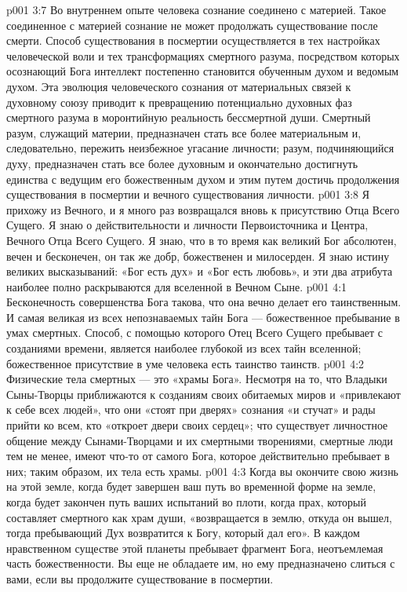 \vs p001 3:7 \pc Во внутреннем опыте человека сознание соединено с материей. Такое соединенное с материей сознание не может продолжать существование после смерти. Способ существования в посмертии осуществляется в тех настройках человеческой воли и тех трансформациях смертного разума, посредством которых осознающий Бога интеллект постепенно становится обученным духом и ведомым духом. Эта эволюция человеческого сознания от материальных связей к духовному союзу приводит к превращению потенциально духовных фаз смертного разума в моронтийную реальность бессмертной души. Смертный разум, служащий материи, предназначен стать все более материальным и, следовательно, пережить неизбежное угасание личности; разум, подчиняющийся духу, предназначен стать все более духовным и окончательно достигнуть единства с ведущим его божественным духом и этим путем достичь продолжения существования в посмертии и вечного существования личности.
\vs p001 3:8 Я прихожу из Вечного, и я много раз возвращался вновь к присутствию Отца Всего Сущего. Я знаю о действительности и личности Первоисточника и Центра, Вечного Отца Всего Сущего. Я знаю, что в то время как великий Бог абсолютен, вечен и бесконечен, он так же добр, божественен и милосерден. Я знаю истину великих высказываний: «Бог есть дух» и «Бог есть любовь», и эти два атрибута наиболее полно раскрываются для вселенной в Вечном Сыне.
\vs p001 4:1 Бесконечность совершенства Бога такова, что она вечно делает его таинственным. И самая великая из всех непознаваемых тайн Бога --- божественное пребывание в умах смертных. Способ, с помощью которого Отец Всего Сущего пребывает с созданиями времени, является наиболее глубокой из всех тайн вселенной; божественное присутствие в уме человека есть таинство таинств.
\vs p001 4:2 Физические тела смертных --- это «храмы Бога». Несмотря на то, что Владыки Сыны\hyp{}Творцы приближаются к созданиям своих обитаемых миров и «привлекают к себе всех людей», что они «стоят при дверях» сознания «и стучат» и рады прийти ко всем, кто «откроет двери своих сердец»; что существует личностное общение между Сынами\hyp{}Творцами и их смертными творениями, смертные люди тем не менее, имеют что\hyp{}то от самого Бога, которое действительно пребывает в них; таким образом, их тела есть храмы.
\vs p001 4:3 Когда вы окончите свою жизнь на этой земле, когда будет завершен ваш путь во временной форме на земле, когда будет закончен путь ваших испытаний во плоти, когда прах, который составляет смертного как храм души, «возвращается в землю, откуда он вышел, тогда пребывающий Дух возвратится к Богу, который дал его». В каждом нравственном существе этой планеты пребывает фрагмент Бога, неотъемлемая часть божественности. Вы еще не обладаете им, но ему предназначено слиться с вами, если вы продолжите существование в посмертии.
